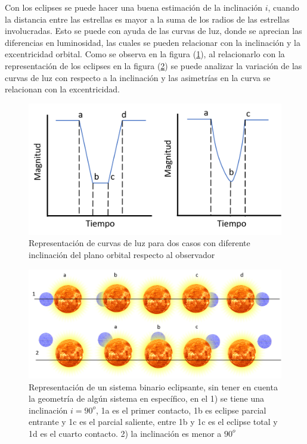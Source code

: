 \documentclass[12pt,oneside,openany,letter]{book}
\begin{document}
\noindent Con los eclipses se puede hacer una buena estimación de la inclinación $i$, cuando la distancia entre las estrellas es mayor a la suma de los radios de las estrellas involucradas. Esto se puede con ayuda de las curvas de luz, donde se aprecian las diferencias en luminosidad, las cuales se pueden relacionar con la inclinación y la  excentricidad orbital. Como se observa en la figura (\ref{fig:curva_luz}), al relacionarlo con la representación de los eclipses en la figura (\ref{representacion_eclipse}) se puede analizar la variación de las curvas de luz con respecto a la inclinación y las asimetrías en la curva se relacionan con la excentricidad.

\begin{figure}[h]
    \centering
    \includegraphics[width=0.65\linewidth]{Images/curvaluz.png}
    \caption{Representación de curvas de luz para dos casos con diferente inclinación del plano orbital respecto al observador}
    \label{fig:curva_luz}
\end{figure}


\begin{figure}[h]
    \centering
    \includegraphics[width=1\linewidth]{Images/representacion_eclipse.png}
    \caption{Representación de un sistema binario eclipsante, sin tener en cuenta la geometría de algún sistema en específico, en el 1) se tiene una inclinación $i = 90^{o}$, 1a es el primer contacto, 1b es eclipse parcial entrante y 1c es el parcial saliente, entre 1b y 1c es el eclipse total y 1d es el cuarto contacto. 2) la inclinación es menor a $90^{o}$ }
    \label{representacion_eclipse}
\end{figure}
\end{document}

